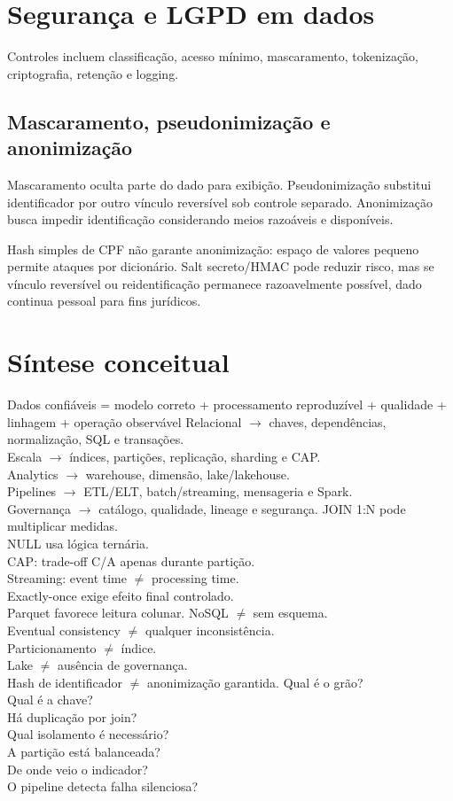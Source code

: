 \section{Segurança e LGPD em dados}

Controles incluem classificação, acesso mínimo, mascaramento, tokenização, criptografia, retenção e logging.

\subsection{Mascaramento, pseudonimização e anonimização}

Mascaramento oculta parte do dado para exibição. Pseudonimização substitui identificador por outro vínculo reversível sob controle separado. Anonimização busca impedir identificação considerando meios razoáveis e disponíveis.

Hash simples de CPF não garante anonimização: espaço de valores pequeno permite ataques por dicionário. Salt secreto/HMAC pode reduzir risco, mas se vínculo reversível ou reidentificação permanece razoavelmente possível, dado continua pessoal para fins jurídicos.

\section{Síntese conceitual}

{Dados confiáveis = modelo correto + processamento reproduzível + qualidade + linhagem + operação observável}
{Relacional $\rightarrow$ chaves, dependências, normalização, SQL e transações.\\Escala $\rightarrow$ índices, partições, replicação, sharding e CAP.\\Analytics $\rightarrow$ warehouse, dimensão, lake/lakehouse.\\Pipelines $\rightarrow$ ETL/ELT, batch/streaming, mensageria e Spark.\\Governança $\rightarrow$ catálogo, qualidade, lineage e segurança.}
{JOIN 1:N pode multiplicar medidas.\\NULL usa lógica ternária.\\CAP: trade-off C/A apenas durante partição.\\Streaming: event time $\neq$ processing time.\\Exactly-once exige efeito final controlado.\\Parquet favorece leitura colunar.}
{NoSQL $\neq$ sem esquema.\\Eventual consistency $\neq$ qualquer inconsistência.\\Particionamento $\neq$ índice.\\Lake $\neq$ ausência de governança.\\Hash de identificador $\neq$ anonimização garantida.}
{Qual é o grão?\\Qual é a chave?\\Há duplicação por join?\\Qual isolamento é necessário?\\A partição está balanceada?\\De onde veio o indicador?\\O pipeline detecta falha silenciosa?}

